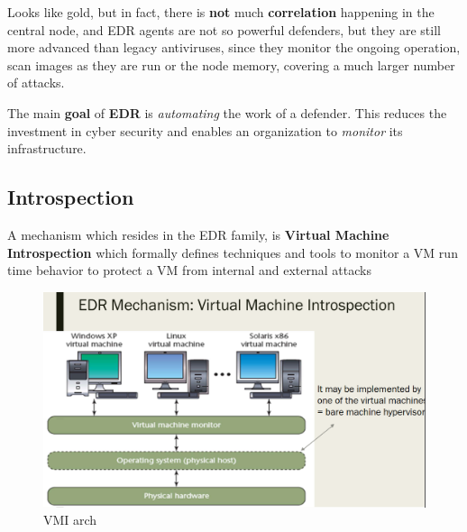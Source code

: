 Looks like gold, but in fact, there is \textbf{not} much \textbf{correlation} happening in the central node,
and EDR agents are not so powerful defenders,
but they are still more advanced than legacy antiviruses,
since they monitor the ongoing operation, scan images as they are
run or the node memory, covering a much larger number of
attacks.

The main \textbf{goal} of \textbf{EDR} is \textit{automating} the work of a defender.
This reduces the investment in cyber security and enables an
organization to \textit{monitor} its infrastructure.

\subsection{Introspection}
A mechanism which resides in the EDR family, is \textbf{Virtual Machine Introspection} which formally defines techniques and tools to monitor a VM run time behavior to protect a VM from internal and external attacks


\begin{figure}[htbp]
   \centering
   \includegraphics{images/VMI_arch.png}
   \caption{VMI arch}
   \label{fig:VMI_arch}
\end{figure}

